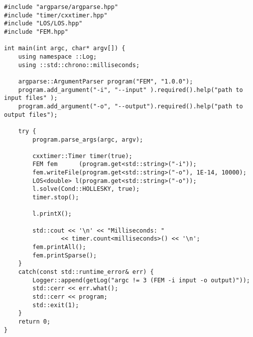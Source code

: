 \documentclass[12pt,a4paper]{article}
\begin{document}
\begin{verbatim}
#include "argparse/argparse.hpp"
#include "timer/cxxtimer.hpp"
#include "LOS/LOS.hpp"
#include "FEM.hpp"

int main(int argc, char* argv[]) {
    using namespace ::Log;
    using ::std::chrono::milliseconds;

    argparse::ArgumentParser program("FEM", "1.0.0");
    program.add_argument("-i", "--input" ).required().help("path to input files" );
    program.add_argument("-o", "--output").required().help("path to output files");

    try {
        program.parse_args(argc, argv);

        cxxtimer::Timer timer(true);
        FEM fem      (program.get<std::string>("-i"));
        fem.writeFile(program.get<std::string>("-o"), 1E-14, 10000);
        LOS<double> l(program.get<std::string>("-o"));
        l.solve(Cond::HOLLESKY, true);
        timer.stop();

        l.printX();

        std::cout << '\n' << "Milliseconds: "
                << timer.count<milliseconds>() << '\n';
        fem.printAll();
        fem.printSparse();
    }
    catch(const std::runtime_error& err) {
        Logger::append(getLog("argc != 3 (FEM -i input -o output)"));
        std::cerr << err.what();
        std::cerr << program;
        std::exit(1);
    }
    return 0;
}
\end{verbatim}
\end{document}
